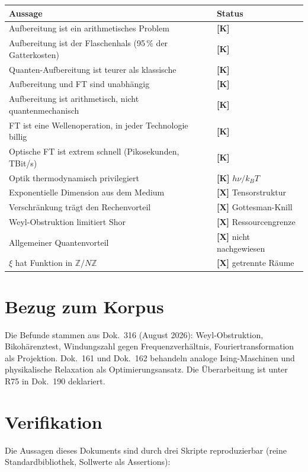 \begin{center}
\begin{tabular}{ll}
\toprule
Aussage & Status \\
\midrule
Aufbereitung ist ein arithmetisches Problem & \textbf{[K]} \\
Aufbereitung ist der Flaschenhals (95\,\% der Gatterkosten) & \textbf{[K]} \\
Quanten-Aufbereitung ist teurer als klassische & \textbf{[K]} \\
Aufbereitung und FT sind unabhängig & \textbf{[K]} \\
Aufbereitung ist arithmetisch, nicht quantenmechanisch & \textbf{[K]} \\
FT ist eine Wellenoperation, in jeder Technologie billig & \textbf{[K]} \\
Optische FT ist extrem schnell (Pikosekunden, TBit/s) & \textbf{[K]} \\
Optik thermodynamisch privilegiert & \textbf{[K]} $h\nu/k_BT$ \\
Exponentielle Dimension aus dem Medium & \textbf{[X]} Tensorstruktur \\
Verschränkung trägt den Rechenvorteil & \textbf{[X]} Gottesman-Knill \\
Weyl-Obstruktion limitiert Shor & \textbf{[X]} Ressourcengrenze \\
Allgemeiner Quantenvorteil & \textbf{[X]} nicht nachgewiesen \\
$\xi$ hat Funktion in $\mathbb{Z}/N\mathbb{Z}$ & \textbf{[X]} getrennte Räume \\
\bottomrule
\end{tabular}
\end{center}

\section{Bezug zum Korpus}

Die Befunde stammen aus Dok.~316 (August 2026): Weyl-Obstruktion,
Bikohärenztest, Windungszahl gegen Frequenzverhältnis,
Fouriertransformation als Projektion. Dok.~161 und Dok.~162 behandeln
analoge Ising-Maschinen und physikalische Relaxation als Optimierungsansatz.
Die Überarbeitung ist unter R75 in Dok.~190 deklariert.

\section{Verifikation}

Die Aussagen dieses Dokuments sind durch drei Skripte reproduzierbar
(reine Standardbibliothek, Sollwerte als Assertions):

